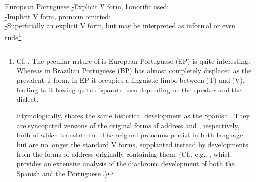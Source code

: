 \pex
	\a European Portuguese
		\beginsubsub
			\b{-}{Explicit V form, honorific used:\\
				 }
			\b{-}{Implicit V form, pronoun omitted:\\
				 }
			\b{-}{Superficially an explicit V form, but may be interpreted as informal or even rude\footnote{
				Cf. \textcite{laraport}. The peculiar nature of  is European Portuguese (EP) is quite interesting. Whereas in Brazilian Portuguese (BP)  has almost completely displaced  as the prevalent T form, in EP it occupies a linguistic limbo between  (T) and  (V), leading to it having quite disparate uses depending on the speaker and the dialect.

				Etymologically,  shares the same historical
				development as the Spanish . They
				are syncopated versions of the original forms of address
				 and ,
				respectively, both of which translate to . The original pronouns 
				persist in both language but are no longer the standard V forms,
				supplanted instead by developments from the forms of address
				originally containing them. (Cf., e.g., \cite{hummelport}, which
				provides an extensive analysis of the diachronic development of
				both the Spanish  and the Portuguese
				.)
	
}}
